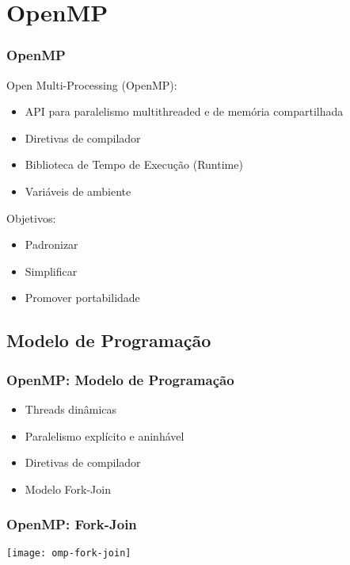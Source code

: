 \documentclass[10pt, compress, aspectratio=169, xcolor={table,usenames,dvipsnames}]{beamer}
\begin{document}
\section{OpenMP}

\begin{frame}
    \frametitle{OpenMP}
    \alert{Open Multi-Processing} (OpenMP):
    \begin{itemize}
        \item API para paralelismo \alert{multithreaded} e de \alert{memória
            compartilhada}
        \item \alert{Diretivas de compilador}
        \item Biblioteca de \alert{Tempo de Execução} (\alert{Runtime})
        \item Variáveis de ambiente
    \end{itemize}

    Objetivos:
    \begin{itemize}
        \item Padronizar
        \item Simplificar
        \item Promover \alert{portabilidade}
    \end{itemize}
\end{frame}

\subsection{Modelo de Programação}

\begin{frame}
    \frametitle{OpenMP: Modelo de Programação}
    \begin{itemize}
        \item Threads \alert{dinâmicas}
        \item Paralelismo \alert{explícito e aninhável}
        \item \alert{Diretivas} de compilador
        \item Modelo \alert{Fork-Join}
    \end{itemize}
\end{frame}

\begin{frame}
    \frametitle{OpenMP: Fork-Join}
    \begin{center}
        \texttt{[image: omp-fork-join]}
    \end{center}
\end{frame}
\end{document}
